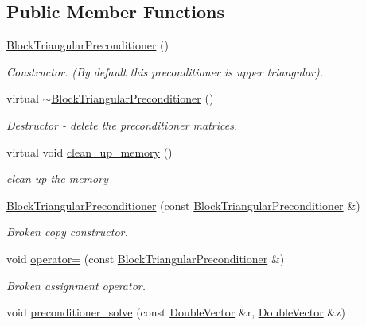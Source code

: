 \subsection*{Public Member Functions}
\begin{DoxyCompactItemize}
\item 
\hyperlink{classoomph_1_1BlockTriangularPreconditioner_a79e23b3f3765ee0b8bc0f8f98f531277}{Block\+Triangular\+Preconditioner} ()
\begin{DoxyCompactList}\small\item\em Constructor. (By default this preconditioner is upper triangular). \end{DoxyCompactList}\item 
virtual \hyperlink{classoomph_1_1BlockTriangularPreconditioner_a021cfd0194fc0ffc622ba3387eb5daca}{$\sim$\+Block\+Triangular\+Preconditioner} ()
\begin{DoxyCompactList}\small\item\em Destructor -\/ delete the preconditioner matrices. \end{DoxyCompactList}\item 
virtual void \hyperlink{classoomph_1_1BlockTriangularPreconditioner_aec59a3bb131cd924d3efa6873a187a0f}{clean\+\_\+up\+\_\+memory} ()
\begin{DoxyCompactList}\small\item\em clean up the memory \end{DoxyCompactList}\item 
\hyperlink{classoomph_1_1BlockTriangularPreconditioner_acb2ca9f54d7edb2199e193cb27f4a9e2}{Block\+Triangular\+Preconditioner} (const \hyperlink{classoomph_1_1BlockTriangularPreconditioner}{Block\+Triangular\+Preconditioner} \&)
\begin{DoxyCompactList}\small\item\em Broken copy constructor. \end{DoxyCompactList}\item 
void \hyperlink{classoomph_1_1BlockTriangularPreconditioner_a1b3c9fdcc5997c2f91668b2c1454ae59}{operator=} (const \hyperlink{classoomph_1_1BlockTriangularPreconditioner}{Block\+Triangular\+Preconditioner} \&)
\begin{DoxyCompactList}\small\item\em Broken assignment operator. \end{DoxyCompactList}\item 
void \hyperlink{classoomph_1_1BlockTriangularPreconditioner_aede879082caa04a2de50c811ee6d7f5b}{preconditioner\+\_\+solve} (const \hyperlink{classoomph_1_1DoubleVector}{Double\+Vector} \&r, \hyperlink{classoomph_1_1DoubleVector}{Double\+Vector} \&z)

\end{DoxyCompactItemize}
